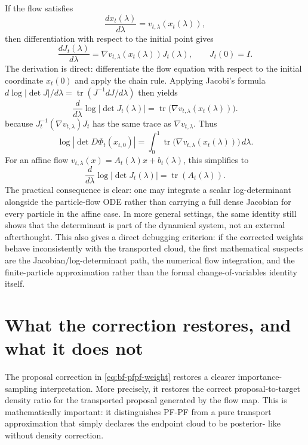 If the flow satisfies
\begin{equation}
\label{eq:bf-pfpf-general-flow}
  \frac{dx_t(\lambda)}{d\lambda} = v_{t,\lambda}(x_t(\lambda)),
\end{equation}
then differentiation with respect to the initial point gives
\begin{equation}
\label{eq:bf-pfpf-jacobian-ode}
  \frac{dJ_t(\lambda)}{d\lambda}
  = \nabla v_{t,\lambda}(x_t(\lambda)) J_t(\lambda),
  \qquad
  J_t(0)=I.
\end{equation}
The derivation is direct: differentiate the flow equation with respect to the
initial coordinate $x_t(0)$ and apply the chain rule.  Applying Jacobi's formula
$d\log|\det J|/d\lambda=\operatorname{tr}(J^{-1}dJ/d\lambda)$ then yields
\begin{equation}
\label{eq:bf-pfpf-logdet-ode}
  \frac{d}{d\lambda}
  \log \left|\det J_t(\lambda)\right|
  = \operatorname{tr}
    \bigl(\nabla v_{t,\lambda}(x_t(\lambda))\bigr).
\end{equation}
because $J_t^{-1}(\nabla v_{t,\lambda})J_t$ has the same trace as
$\nabla v_{t,\lambda}$.  Thus
\[
  \log|\det D\Phi_t(x_{t,0})|
  =
  \int_0^1
  \operatorname{tr}
  \bigl(\nabla v_{t,\lambda}(x_t(\lambda))\bigr)\,d\lambda.
\]
For an affine flow
$v_{t,\lambda}(x)=A_t(\lambda)x+b_t(\lambda)$, this simplifies to
\begin{equation}
\label{eq:bf-pfpf-logdet-affine}
  \frac{d}{d\lambda}
  \log \left|\det J_t(\lambda)\right|
  = \operatorname{tr}(A_t(\lambda)).
\end{equation}
The practical consequence is clear: one may integrate a scalar log-determinant
alongside the particle-flow ODE rather than carrying a full dense Jacobian for
every particle in the affine case.  In more general settings, the same identity
still shows that the determinant is part of the dynamical system, not an
external afterthought.  This also gives a direct debugging criterion: if the
corrected weights behave inconsistently with the transported cloud, the first
mathematical suspects are the Jacobian/log-determinant path, the numerical flow
integration, and the finite-particle approximation rather than the formal
change-of-variables identity itself.

\section{What the correction restores, and what it does not}
\label{sec:bf-pfpf-what-restored}

The proposal correction in \eqref{eq:bf-pfpf-weight} restores a clearer
importance-sampling interpretation.  More precisely, it restores the correct
proposal-to-target density ratio for the transported proposal generated by the
flow map.  This is mathematically important: it distinguishes PF-PF from a pure
transport approximation that simply declares the endpoint cloud to be posterior-
like without density correction.

